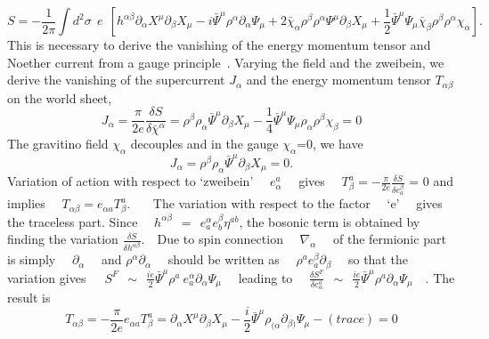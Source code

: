\documentclass[a4paper,showpacs,preprintnumbers,amsmath,amssymb]{revtex4}
\begin{document}
\begin{equation}
S= -\frac{1}{2\pi}\int d^2\sigma ~~e~~\left [ h^{\alpha\beta}\partial_{\alpha}X^{\mu }
\partial_{\beta}X_{\mu } -i\bar \Psi^{\mu}\rho^{\alpha}\partial_{\alpha}
\Psi_{\mu}+ 2\bar{\chi}_{\alpha}\rho^{\beta}\rho^{\alpha}\Psi^{\mu}
\partial_{\beta}X_{\mu}+\frac{1}{2}
\bar{\Psi }^{\mu}\Psi_{\mu}\bar{\chi}_{\beta} \rho^{\beta}\rho^{\alpha}\chi_{\alpha}\right ].
\label{s1}
\end{equation}
This is necessary to derive the vanishing of the energy momentum tensor and Noether current
from a gauge principle~\cite{gr,br}.
Varying the field and the zweibein, we derive the vanishing of the supercurrent 
$J_{\alpha}$ and the energy momentum tensor $T_{\alpha\beta}$ on the world sheet,
\begin{equation}
J_{\alpha}= \frac{\pi}{2e}\frac{\delta S}{\delta\bar{\chi}^{\alpha}}=\rho^{\beta}
\rho_{\alpha}\bar{\Psi}^{\mu}
\partial_{\beta}X_{\mu} -\frac{1}{4}
\bar{\Psi }^{\mu}\Psi_{\mu}\rho_{\alpha}\rho^{\beta}\chi_{\beta} =0
\end{equation}
The gravitino field $\chi_{\alpha}$ decouples and in the gauge $\chi_{\alpha}$=0,
we have
\begin{equation}
J_{\alpha}=\rho^{\beta}\rho_{\alpha}\bar{\Psi}^{\mu}\partial_{\beta}X_{\mu}=0.
\end{equation}
Variation of action with respect to `zweibein' ~~$e^a_{\alpha}$ ~~gives 
~~$T_{\beta}^a=-\frac{\pi}{2e}\frac{\delta S}{\delta e^{\beta}_a}$ = 0 and implies~~
$T_{\alpha\beta}=e_{\alpha a}T_{\beta}^a$. ~~~The variation with respect to the factor 
~~`e'~~ gives the traceless part. Since ~~$h^{\alpha\beta}~~
=~~e^{\alpha}_a e^{\beta}_b \eta^{ab}$, the bosonic term is obtained by finding the 
variation $\frac{\delta S}{\delta h^{\alpha\beta}}$.~~Due to spin connection~~
$\nabla_{\alpha}$~~ of the fermionic part is simply ~~$\partial_{\alpha}$~~ and
$\rho^{\alpha}\partial_{\alpha}$~~ should be written as ~~$\rho^a e_a^{\beta}
\partial_{\beta}$~~ so that the variation gives~~~$ S^F~~\sim~~ \frac{ie}{2}
\bar{\Psi}^{\mu}\rho^a~e^{\alpha}_a\partial_{\alpha}\Psi_{\mu}$~~ 
leading to ~~$\frac{\delta S^F}{\delta e^a_{\alpha}}~~\sim~~\frac{ie}{2}
\bar{\Psi}^{\mu}\rho^a\partial_{\alpha}\Psi_{\mu}$~~. The result is
\begin{equation}
T_{\alpha\beta}= - \frac{\pi}{2e}e_{\alpha a} T^a_{\beta} =
\partial_{\alpha}X^{\mu }
\partial_{\beta}X_{\mu }- \frac{i}{2}\bar{\Psi}^{\mu}\rho_{(\alpha}\partial_{\beta )}
\Psi_{\mu}-(trace)=0
\end{equation}
\end{document}
